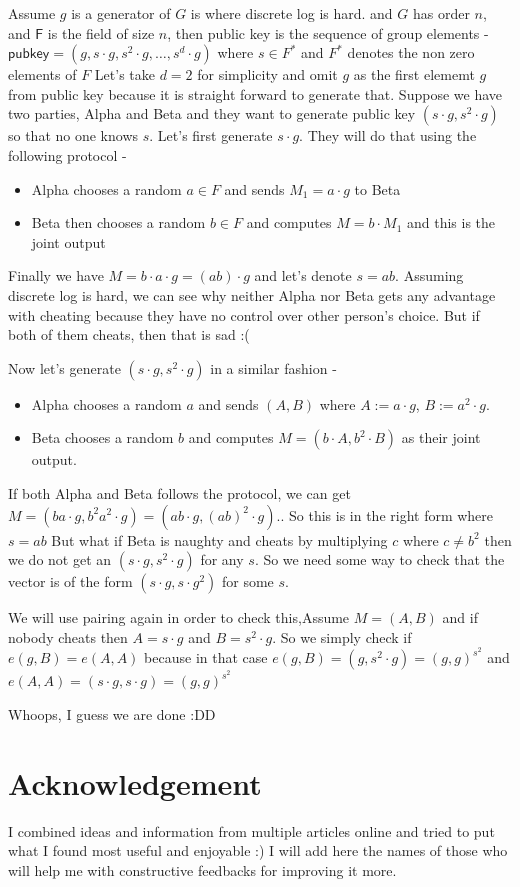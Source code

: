 \documentclass[12pt,letterpaper]{article}
\begin{document}
Assume $g$ is a generator of $G$ is where discrete log is hard. and $G$ has order $n$, and $\mathsf{F}$ is the field of size $n$, then public key is the sequence of group elements - 
$\mathsf{pubkey}=(g,s\cdot g, s^2\cdot g,\ldots, s^d\cdot g)$
where $s\in F^*$ and $F^*$ denotes the non zero elements of $F$
Let's take $d=2$ for simplicity and omit $g$ as the first elememt $g$ from public key because it is straight forward to generate that. Suppose we have two parties, Alpha and Beta and they want to generate public key $(s\cdot g, s^2\cdot g)$ so that no one knows $s$. Let's first generate $s\cdot g$. They will do that using the following protocol - 
\begin{itemize}
    \item Alpha chooses a random $a\in F$ and sends $M_1=a\cdot g$ to Beta
    \item Beta then chooses a random $b\in F$ and computes $M = b \cdot M_1$ and this is the joint output
\end{itemize}
Finally we have $M=b\cdot a\cdot g= (ab)\cdot g$ and let's denote $s=ab$. Assuming discrete log is hard, we can see why neither Alpha nor Beta gets any advantage with cheating because they have no control over other person's choice. But if both of them cheats, then that is sad :( 

Now let's generate $(s\cdot g,s^2\cdot g)$ in a similar fashion -
\begin{itemize}
    \item Alpha chooses a random $a$ and sends $(A,B)$ where $A:= a\cdot g$, $B:= a^2\cdot g$. 
    \item  Beta chooses a random $b$ and computes $M = (b\cdot A,b^2\cdot B)$ as their joint output.
\end{itemize}
If both Alpha and Beta follows the protocol, we can get $M=(b a \cdot g, b^2 a^2 \cdot g) = ( a b\cdot g, (a b)^2\cdot g).$. So this is in the right form where $s=ab$ But what if Beta is naughty and cheats by multiplying $c$ where $c\ne b^2$ then we do not get an $(s\cdot g,s^2\cdot g)$ for any $s$. So we need some way to check that the vector is of the form $(s\cdot g,s\cdot g^2)$ for some $s$. 

We will use pairing again in order to check this,Assume $M=(A,B)$ and if nobody cheats then $A=s\cdot g$ and $B=s^2 \cdot g$. So we simply check if $e(g,B) = e(A,A)$ because in that case $e(g,B)=(g,s^2\cdot g)=(g,g)^{s^2}$ and $e(A,A)=(s\cdot g, s\cdot g)=(g,g)^{s^2}$

Whoops, I guess we are done :DD
\section{Acknowledgement}

I combined ideas and information from multiple articles online and tried to put what I found most useful and enjoyable :) I will add here the names of those who will help me with constructive feedbacks for improving it more. 
\end{document}

